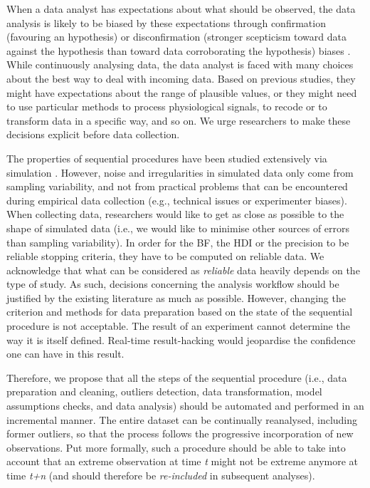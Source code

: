 \documentclass[a4paper,jou,natbib,floatsintext,donotrepeattitle]{apa6}
\begin{document}
When a data analyst has expectations about what should be observed, the data analysis is likely to be biased by these expectations through confirmation (favouring an hypothesis) or disconfirmation (stronger scepticism toward data against the hypothesis than toward data corroborating the hypothesis) biases \citep{lilienfeld_blind_2017}. While continuously analysing data, the data analyst is faced with many choices about the best way to deal with incoming data. Based on previous studies, they might have expectations about the range of plausible values, or they might need to use particular methods to process physiological signals, to recode or to transform data in a specific way, and so on. We urge researchers to make these decisions explicit before data collection. \par

The properties of sequential procedures have been studied extensively via simulation \citep{schonbrodt_sequential_2017,wagenmakers_bayesian_2017,kruschke_doing_2015}. However, noise and irregularities in simulated data only come from sampling variability, and not from practical problems that can be encountered during empirical data collection (e.g., technical issues or experimenter biases). When collecting data, researchers would like to get as close as possible to the shape of simulated data (i.e., we would like to minimise other sources of errors than sampling variability). In order for the BF, the HDI or the precision to be reliable stopping criteria, they have to be computed on reliable data. We acknowledge that what can be considered as \textit{reliable} data heavily depends on the type of study. As such, decisions concerning the analysis workflow should be justified by the existing literature as much as possible. However, changing the criterion and methods for data preparation based on the state of the sequential procedure is not acceptable. The result of an experiment cannot determine the way it is itself defined. Real-time result-hacking would jeopardise the confidence one can have in this result. \par

Therefore, we propose that all the steps of the sequential procedure (i.e., data preparation and cleaning, outliers detection, data transformation, model assumptions checks, and data analysis) should be automated and performed in an incremental manner. The entire dataset can be continually reanalysed, including former outliers, so that the process  follows the progressive incorporation of new observations. Put more formally, such a procedure should be able to take into account that an extreme observation at time \textit{t} might not be extreme anymore at time \textit{t+n} (and should therefore be \textit{re-included} in subsequent analyses).
\end{document}

